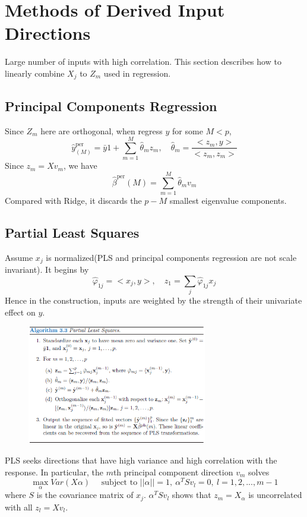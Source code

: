 
\section{Methods of Derived Input Directions}
Large number of inputs with high correlation. This section describes how to linearly
combine $X_j$ to $Z_m$ used in regression. 
\subsection{Principal Components Regression}
Since $Z_m$ here are orthogonal, when regress $y$ for some $M<p$,
\begin{equation*}
\hat{y}_{(M)}^{\text{per}}=\bar{y}1+\sum_{m=1}^M\hat{\theta}_mz_m,\quad
\hat{\theta}_m=\frac{<z_m,y>}{<z_m,z_m>}
\end{equation*}
Since $z_m=Xv_m$, we have
\begin{equation*}
\hat{\beta}^{\text{per}}(M)=\sum_{m=1}^M\hat{\theta}_mv_m
\end{equation*}
Compared with Ridge, it discards the $p-M$ smallest eigenvalue components. 
 
\subsection{Partial Least Squares}
Assume $x_j$ is normalized(PLS and principal components regression are not
scale invariant). It begins by
\begin{equation*}
\hat{\varphi}_{1j}=<x_j,y>, \quad z_1=\sum_j\hat{\varphi}_{1j}x_j
\end{equation*}
Hence in the construction, inputs are weighted by the strength of their univariate 
effect on $y$. 
\begin{figure}[H]
    \centering
    \includegraphics[width=0.7\textwidth]{Figures/PLSAlgo}
    \label{fig:}
\end{figure}
PLS seeks directions that have high variance and high correlation with the response. 
In particular, the $m$th principal component direction $v_m$ solves
\begin{equation*}
\max_\alpha Var(X\alpha) \quad\text{ subject to } 
||\alpha||=1,~\alpha^TSv_l=0,~l=1,2,...,m-1
\end{equation*}
where $S$ is the covariance matrix of $x_j$. $\alpha^TSv_l$ shows that $z_m=X_\alpha$
is uncorrelated with all $z_l=Xv_l$. 

